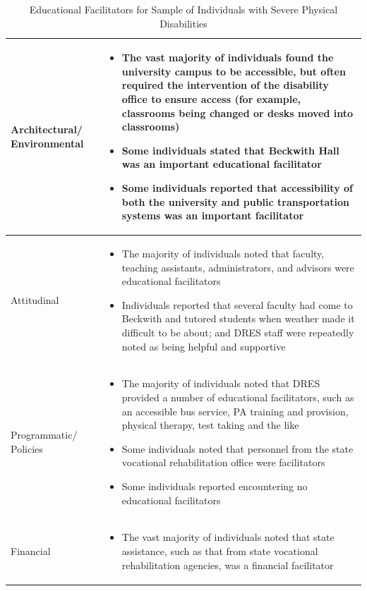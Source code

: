 \documentclass[11.5pt]{sig-alternate} %
\begin{document}
\begin{large}
\begin{table}[th]
    \caption{Educational Facilitators for Sample of Individuals with Severe Physical Disabilities}
    \begin{tabular}{|l|l|}
    \hline
    Architectural/ Environmental & 
    \begin{itemize}[noitemsep, topsep=0pt, leftmargin=*]
    \item The vast majority of individuals found the university campus to be accessible, but often required the intervention of the disability office to ensure access (for example, classrooms being changed or desks moved into classrooms)
    \item Some individuals stated that Beckwith Hall was an important educational facilitator
    \item Some individuals reported that accessibility of both the university and public transportation systems was an important facilitator
    \end{itemize} \\ \hline
    Attitudinal &
    \begin{itemize}[noitemsep, topsep=0pt, leftmargin=*]
    \item The majority of individuals noted that faculty, teaching assistants, administrators, and advisors were educational facilitators
    \item Individuals reported that several faculty had come to Beckwith and tutored students when weather made it difficult to be about; and DRES staff were repeatedly noted as being helpful and supportive
    \end{itemize} \\ \hline
    Programmatic/ Policies &
    \begin{itemize}[noitemsep, topsep=0pt, leftmargin=*]
    \item The majority of individuals noted that DRES provided a number of educational facilitators, such as an accessible bus service, PA training and provision, physical therapy, test taking and the like
    \item Some individuals noted that personnel from the state vocational rehabilitation office were facilitators
    \item Some individuals reported encountering no educational facilitators
    \end{itemize} \\ \hline
    Financial &
    \begin{itemize}[noitemsep, topsep=0pt, leftmargin=*]
    \item The vast majority of individuals noted that state assistance, such as that from state vocational rehabilitation agencies, was a financial facilitator

\end{itemize}
\end{tabular}
\end{table}
\end{large}
\end{document}
